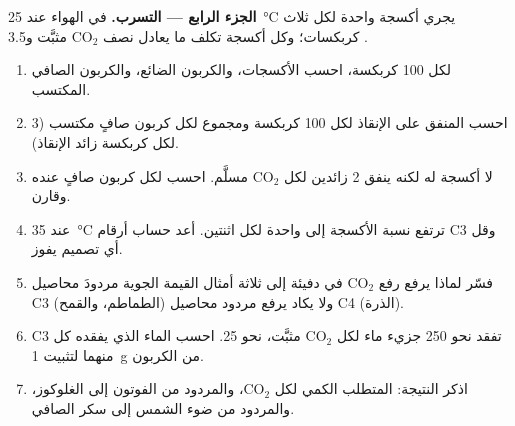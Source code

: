 \begin{problem}
\medskip
\noindent\textbf{الجزء الرابع --- التسرب.}
 في الهواء عند \qty{25}{\celsius} يجري أكسجة واحدة لكل ثلاث
كربكسات؛ وكل أكسجة تكلف ما يعادل نصف $\mathrm{CO_2}$ مثبَّت
و3.5 .
\begin{enumerate}[resume]
  \item لكل 100 كربكسة، احسب الأكسجات، والكربون الضائع، والكربون
        الصافي المكتسب.
  \item احسب  المنفق على الإنقاذ لكل 100 كربكسة ومجموع  لكل
        كربون صافٍ مكتسب (3   لكل كربكسة زائد
        الإنقاذ).
  \item {} لا أكسجة له لكنه ينفق 2  زائدين لكل
        $\mathrm{CO_2}$ مسلَّم. احسب  لكل كربون صافٍ عنده وقارن.
  \item عند \qty{35}{\celsius} ترتفع نسبة الأكسجة إلى واحدة لكل
        اثنتين. أعد حساب أرقام C3 وقل أي تصميم يفوز.
  \item فسّر لماذا يرفع رفع $\mathrm{CO_2}$ في دفيئة إلى ثلاثة أمثال
        القيمة الجوية مردودَ محاصيل C3 (الطماطم، والقمح) ولا يكاد يرفع
        مردود محاصيل C4 (الذرة).
  \item {} C3 تفقد نحو 250 جزيء ماء لكل $\mathrm{CO_2}$ مثبَّت،
         نحو 25. احسب الماء الذي يفقده كل منهما لتثبيت
        \qty{1}{g} من الكربون.
  \item اذكر النتيجة: المتطلب الكمي لكل $\mathrm{CO_2}$، والمردود من
        الفوتون إلى الغلوكوز، والمردود من ضوء الشمس إلى سكر 
        الصافي.
\end{enumerate}
\end{problem}

